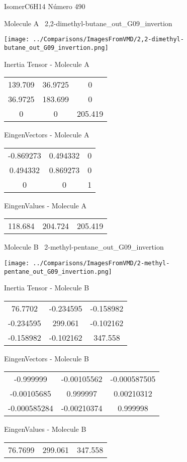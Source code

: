 \vtab[-3cm]
\begin{center}
{\large IsomerC6H14 \tab Número 490}
\end{center}
\begin{multicols}{2}
\begin{center}

Molecule A \
2,2-dimethyl-butane\_out\_G09\_invertion

\texttt{[image: ../Comparisons/ImagesFromVMD/2,2-dimethyl-butane\_out\_G09\_invertion.png]}

Inertia Tensor - Molecule A \\
\begin{tabular}{|c c c|}
139.709	 & 	36.9725	 & 	0	 \\
36.9725	 & 	183.699	 & 	0	 \\
0	 & 	0	 & 	205.419
\end{tabular}

\vtab
 EingenVectors - Molecule A     \\
\begin{tabular}{|c c c|}
-0.869273	 & 	0.494332	 & 	0	 \\
0.494332	 & 	0.869273	 & 	0	 \\
0	 & 	0	 & 	1
\end{tabular}

\vtab
 EingenValues - Molecule A     \\
\begin{tabular}{|c c c|}
118.684	 & 	204.724	 & 	205.419	 \\
\end{tabular}
\columnbreak

Molecule B \
2-methyl-pentane\_out\_G09\_invertion

\texttt{[image: ../Comparisons/ImagesFromVMD/2-methyl-pentane\_out\_G09\_invertion.png]}

Inertia Tensor - Molecule B \\
\begin{tabular}{|c c c|}
76.7702	 & 	-0.234595	 & 	-0.158982	 \\
-0.234595	 & 	299.061	 & 	-0.102162	 \\
-0.158982	 & 	-0.102162	 & 	347.558
\end{tabular}

\vtab
 EingenVectors - Molecule B     \\
\begin{tabular}{|c c c|}
-0.999999	 & 	-0.00105562	 & 	-0.000587505	 \\
-0.00105685	 & 	0.999997	 & 	0.00210312	 \\
-0.000585284	 & 	-0.00210374	 & 	0.999998
\end{tabular}

\vtab
 EingenValues - Molecule B     \\
\begin{tabular}{|c c c|}
76.7699	 & 	299.061	 & 	347.558	 \\
\end{tabular}

\end{center}
\end{multicols}

